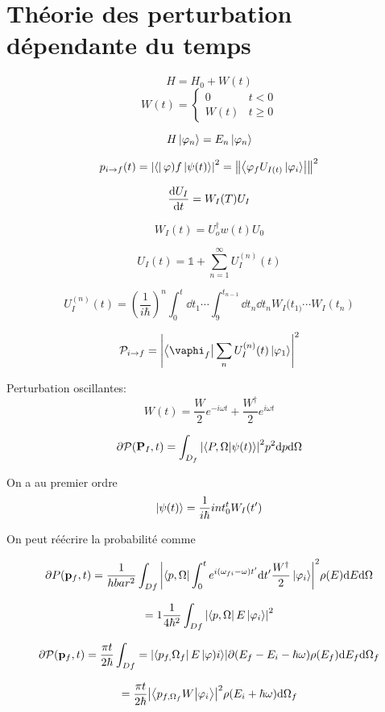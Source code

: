 



\section*{Théorie des perturbation dépendante du temps}

$$H = H_0 + W(t)$$ 
$$W(t) = \begin{cases}
	0 & t<0\\
	W(t) & t\geq 0
\end{cases}$$ 

$$H\ket{\varphi_n} = E_n \ket{\varphi_n}$$ 

$$p_{i\to f}(t)  = \abs{\bra{}{\varphi)f}\ket{\psi(t)}}^2 = \norm{\bra{\varphi_f U_{I(t)} \ket{\varphi_i}}}^2 $$ 

$$ \dv{U_I}{t} = W_I (T) U_I$$ 

$$W_I (t) = U_o^\dagger w(t) U_0$$ 

$$U_I (t) = \mathds{1} + \sum_{n=1}^{\infty} U_I^{(n)} (t)$$ 

$$U_I^{(n)} (t) = \left( \frac{1}{i\hbar}  \right)^n \int_0^t \dd t_1 \dotsb \int_9^{t_{n-1} } \dd t_n \dd t_n W_I (t_{1)} \dotsb W_I (t_n ) $$ 


$$\mathcal{P}_{i \to f} = \abs{\bra{\vaphi_f} \sum_n U_I^{(n)} (t) \ket{\varphi_1}}^2$$ 

Perturbation oscillantes:
$$W(t) = \frac{W}{2} e^{-i\omega t} + \frac{W^\dagger}{2} e^{i\omega t}$$ 

$$\partial \mathcal{P} (\vb{P}_I ,t) = \int_{D_f} \abs{\braket{P, \Omega}{\psi(t)} }^2 p^2 \dd p \dd\Omega$$ 

On a au premier ordre $$\ket{\psi(t)} = \frac{1}{i\hbar} int_0^t W_{I}(t') $$  

On peut réécrire la probabilité comme 

$$\partial P(\vb{p}_f ,t) = \frac{1}{hbar^2} \int_{Df} \abs{\bra{p, \Omega} \int_0^t e^{i(\omega_{fi}-\omega) t'} \dd t' \frac{W^\dagger}{2} \ket{\varphi_i}}^2 \rho(E) \dd E \dd \Omega$$ 

$$= 1 \frac{1}{4\hbar^2} \int_{Df} \abs{\bra{p,\Omega} E \ket{\varphi_i}}^2$$ 

$$\partial \mathcal{P} (\vb{p}_f,t) = \frac{\pi{}t}{2\hbar} \int_{Df} = \abs{\bra{p_{f,} \Omega_{f}} E \ket{\varphi)i} }  \partial (E_f -E_i -\hbar\omega) \rho (E_f ) \dd E_f \dd\Omega_f $$ 

$$= \frac{\pi{}t}{2\hbar} \abs{\bra{p_{f,\Omega_f}W} \ket{\varphi_i}}^2 \rho(E_i + \hbar\omega) \dd\Omega_f $$ 

